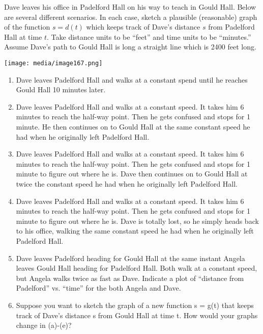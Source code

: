 \item Dave leaves his office in Padelford Hall on his way to teach in Gould
  Hall. Below are several different scenarios. In each case, sketch a
  plausible (reasonable) graph of the function $s = d(t)$ which keeps track of Dave's distance $s$ from
  Padelford Hall at time $t$. Take distance units to be ``feet''
  and time units to be ``minutes.'' Assume Dave's path to Gould Hall is
  long a straight line which is 2400 feet long. %

  \texttt{[image: media/image167.png]}


\begin{enumerate}
\def\labelenumi{\alph{enumi}.}
\item
  Dave leaves Padelford Hall and walks at a constant spend until he
  reaches Gould Hall 10 minutes later.
\item
  Dave leaves Padelford Hall and walks at a constant speed. It takes him
  6 minutes to reach the half-way point. Then he gets confused and stops
  for 1 minute. He then continues on to Gould Hall at the same constant
  speed he had when he originally left Padelford Hall.
\item
  Dave leaves Padelford Hall and walks at a constant speed. It takes him
  6 minutes to reach the half-way point. Then he gets confused and stops
  for 1 minute to figure out where he is. Dave then continues on to
  Gould Hall at twice the constant speed he had when he originally left
  Padelford Hall.
\item
  Dave leaves Padelford Hall and walks at a constant speed. It takes him
  6 minutes to reach the half-way point. Then he gets confused and stops
  for 1 minute to figure out where he is. Dave is totally lost, so he
  simply heads back to his office, walking the same constant speed he
  had when he originally left Padelford Hall.
\item
  Dave leaves Padelford heading for Gould Hall at the same instant
  Angela leaves Gould Hall heading for Padelford Hall. Both walk at a
  constant speed, but Angela walks twice as fast as Dave. Indicate a
  plot of ``distance from Padelford'' vs. ``time'' for the both Angela
  and Dave.
\item
  Suppose you want to sketch the graph of a new function s = g(t) that
  keeps track of Dave's distance s from Gould Hall at time t. How would
  your graphs change in (a)-(e)?
\end{enumerate}



